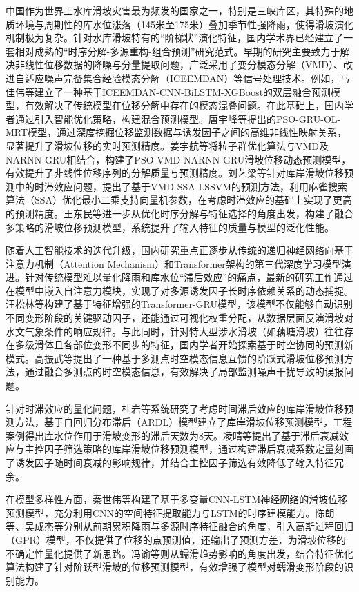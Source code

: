 \documentclass[12pt,a4paper]{article}
\begin{document}
中国作为世界上水库滑坡灾害最为频发的国家之一，特别是三峡库区，其特殊的地质环境与周期性的库水位涨落（145米至175米）叠加季节性强降雨，使得滑坡演化机制极为复杂。针对水库滑坡特有的“阶梯状”演化特征，国内学术界已经建立了一套相对成熟的“时序分解-多源重构-组合预测”研究范式。早期的研究主要致力于解决非线性位移数据的降噪与分量提取问题，广泛采用了变分模态分解（VMD）、改进自适应噪声完备集合经验模态分解（ICEEMDAN）等信号处理技术。例如，马佳伟等\cite{ma2025iceemdan}建立了一种基于ICEEMDAN-CNN-BiLSTM-XGBoost的双层融合预测模型，有效解决了传统模型在位移分解中存在的模态混叠问题。在此基础上，国内学者通过引入智能优化策略，构建混合预测模型。唐宇峰等\cite{tang2025pso}提出的PSO-GRU-OL-MRT模型，通过深度挖掘位移监测数据与诱发因子之间的高维非线性映射关系，显著提升了滑坡位移的实时预测精度。姜宇航等\cite{jiang2022pso}将粒子群优化算法与VMD及NARNN-GRU相结合，构建了PSO-VMD-NARNN-GRU滑坡位移动态预测模型，有效提升了非线性位移序列的分解质量与预测精度。刘艺梁等\cite{liu2026vmd}针对库岸滑坡位移预测中的时滞效应问题，提出了基于VMD-SSA-LSSVM的预测方法，利用麻雀搜索算法（SSA）优化最小二乘支持向量机参数，在考虑时滞效应的基础上实现了更高的预测精度。王东民等\cite{wang2025optimization}进一步从优化时序分解与特征选择的角度出发，构建了融合多策略的滑坡位移预测模型，系统提升了输入特征的质量与模型的泛化性能。

随着人工智能技术的迭代升级，国内研究重点正逐步从传统的递归神经网络向基于注意力机制（Attention Mechanism）和Transformer架构的第三代深度学习模型演进。针对传统模型难以量化降雨和库水位“滞后效应”的痛点，最新的研究工作通过在模型中嵌入自注意力模块，实现了对多源诱发因子长时序依赖关系的动态捕捉。汪松林等\cite{wang2025transformer}构建了基于特征增强的Transformer-GRU模型，该模型不仅能够自动识别不同变形阶段的关键驱动因子，还能通过可视化权重分配，从数据层面反演滑坡对水文气象条件的响应规律。与此同时，针对特大型涉水滑坡（如藕塘滑坡）往往存在多级滑体且各部位变形不同步的特征，国内学者开始探索基于时空协同的预测新模式。高振武等\cite{gao2025spatiotemporal}提出了一种基于多测点时空模态信息互馈的阶跃式滑坡位移预测方法，通过融合多测点的时空模态信息，有效解决了局部监测噪声干扰导致的误报问题。

针对时滞效应的量化问题，杜岩等\cite{du2024time}系统研究了考虑时间滞后效应的库岸滑坡位移预测方法，基于自回归分布滞后（ARDL）模型建立了库岸滑坡位移预测模型，工程案例得出库水位作用于滑坡变形的滞后天数为8天。凌晴等\cite{ling2025lag}提出了基于滞后衰减效应与主控因子筛选策略的库岸滑坡位移预测模型，通过构建滞后衰减系数定量刻画了诱发因子随时间衰减的影响规律，并结合主控因子筛选有效降低了输入特征冗余。

在模型多样性方面，秦世伟等\cite{qin2025cnn}构建了基于多变量CNN-LSTM神经网络的滑坡位移预测模型，充分利用CNN的空间特征提取能力与LSTM的时序建模能力。陈朗等\cite{chen2024gaussian}、吴成杰等\cite{wu2026gaussian}分别从前期累积降雨与多源时序特征融合的角度，引入高斯过程回归（GPR）模型，不仅提供了位移的点预测值，还输出了预测方差，为滑坡位移的不确定性量化提供了新思路。冯谕等\cite{feng2025creep}则从蠕滑趋势影响的角度出发，结合特征优化算法构建了针对阶跃型滑坡的位移预测模型，有效增强了模型对蠕滑变形阶段的识别能力。
\end{document}

